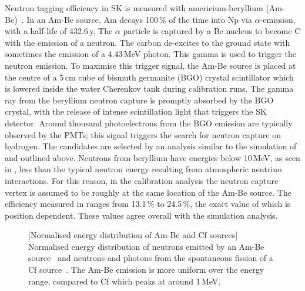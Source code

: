 
Neutron tagging efficiency in SK is measured with americium-beryllium (Am-Be)~\cite{Watanabe:2008ru}.
In an Am-Be source, Am decays 100\,\% of the time into Np via $\alpha$-emission, %
with a half-life of 432.6\,y.
The $\alpha$ particle is captured by a Be nucleus to become C\tapi{*} with the emission of a neutron.
The carbon de-excites to the ground state with sometimes the emission of a 4.43\,MeV photon.
This gamma is used to trigger the neutron emission.
To maximise this trigger signal, the Am-Be source is placed at the centre of a 5\,cm cube of %
bismuth germanite (BGO) crystal scintillator which is lowered inside the water Cherenkov tank during calibration runs.
The gamma ray from the beryllium neutron capture is promptly absorbed by the BGO crystal, %
with the release of intense scintillation light that triggers the SK detector. 
Around thousand photoelectrons from the BGO emission are typically observed by the PMTs; %
this signal triggers the search for neutron capture on hydrogen.
The candidates are selected by an analysis similar to the simulation of  and outlined above.
Neutrons from beryllium have energies below 10\,MeV, as seen in , %
less than the typical neutron energy resulting from atmospheric neutrino interactions.
For this reason, in the calibration analysis the neutron capture vertex is assumed to be roughly at the same location %
of the Am-Be source.
The efficiency measured in  ranges from 13.1\,\% to 24.5\,\%, %
the exact value of which is position dependent.
These values agree overall with the simulation analysis.

\begin{figure}
	\centering
	\resizebox{0.6\textwidth}{!}{}
	[Normalised energy distribution of Am-Be and Cf sources]%
	{Normalised energy distribution of neutrons emitted by an Am-Be source~\cite{PMID:4744412} %
	and neutrons and photons from the spontaneous fission of a Cf source~\cite{PhysRev.104.699, PhysRev.108.411}.
	The Am-Be emission is more uniform over the energy range, compared to Cf which %
	peaks at around 1\,MeV.}
	\label{fig:spectra}
\end{figure}


